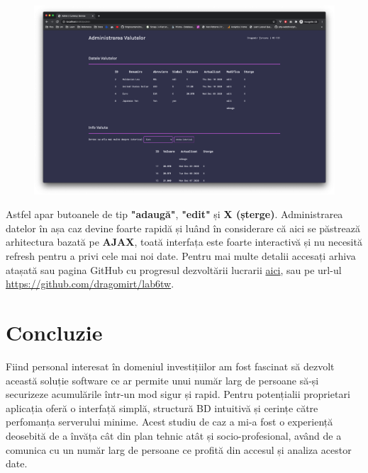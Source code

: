 \documentclass[12pt. a4paper]{report}
\begin{document}
\begin{figure}[H]
\centering
	\includegraphics[width=1.0\textwidth]{admin_page}
\end{figure}

Astfel apar butoanele de tip \textbf{"adaugă"}, \textbf{"edit"} și \textbf{X (șterge)}. Administrarea datelor în așa caz devine foarte rapidă și luând în considerare că aici se păstrează arhitectura bazată pe \textbf{AJAX}, toată interfața este foarte interactivă și nu necesită refresh pentru a privi cele mai noi date. Pentru mai multe detalii accesați arhiva atașată sau pagina GitHub cu progresul dezvoltării lucrarii \href{https://github.com/dragomirt/lab6tw}{aici}, sau pe url-ul \url{https://github.com/dragomirt/lab6tw}.


\chapter{Concluzie}
Fiind personal interesat în domeniul investițiilor am fost fascinat să dezvolt această soluție software ce ar permite unui număr larg de persoane să-și securizeze acumulările într-un mod sigur și rapid. Pentru potențialii proprietari aplicația oferă o interfață simplă, structură BD intuitivă și cerințe către perfomanța serverului minime. Acest studiu de caz a mi-a fost o experiență deosebită de a învăța cât din plan tehnic atât și socio-profesional, având de a comunica cu un număr larg de persoane ce profită din accesul și analiza acestor date.
\end{document}
